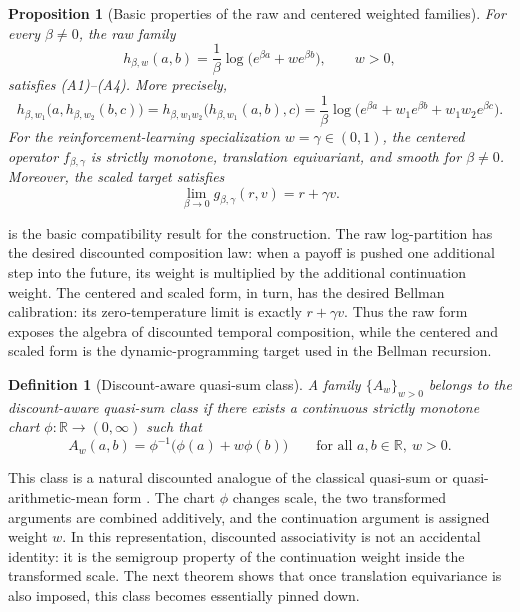 \documentclass{article}
\newtheorem{proposition}[proposition]{Proposition}
\newtheorem{definition}[definition]{Definition}
\theoremstyle{remark}
\newcommand{\R}{\mathbb{R}}
\begin{document}
\begin{proposition}[Basic properties of the raw and centered weighted families]
\label{prop:weighted-basic}
For every $\beta\neq 0$, the raw family
\[
 h_{\beta,w}(a,b)=\frac{1}{\beta}\log\!\bigl(e^{\beta a}+w e^{\beta b}\bigr),
 \qquad w>0,
\]
satisfies \textnormal{(A1)--(A4)}. More precisely,
\begin{equation}
 h_{\beta,w_1}\bigl(a,h_{\beta,w_2}(b,c)\bigr)
 =
 h_{\beta,w_1w_2}\bigl(h_{\beta,w_1}(a,b),c\bigr)
 =
 \frac{1}{\beta}\log\!\bigl(e^{\beta a}+w_1 e^{\beta b}+w_1w_2 e^{\beta c}\bigr).
\label{eq:discounted-assoc-weighted-lse}
\end{equation}
For the reinforcement-learning specialization $w=\gamma\in(0,1)$, the centered operator
$f_{\beta,\gamma}$ is strictly monotone, translation equivariant, and smooth for $\beta\neq 0$.
Moreover, the scaled target satisfies
\[
\lim_{\beta\to 0} g_{\beta,\gamma}(r,v)=r+\gamma v.
\]
\end{proposition}

 is the basic compatibility result for the construction. The raw
log-partition has the desired discounted composition law: when a payoff is pushed one additional
step into the future, its weight is multiplied by the additional continuation weight. The centered and
scaled form, in turn, has the desired Bellman calibration: its zero-temperature limit is exactly
$r+\gamma v$. Thus the raw form exposes the algebra of discounted temporal composition, while
the centered and scaled form is the dynamic-programming target used in the Bellman recursion.

\begin{definition}[Discount-aware quasi-sum class]
\label{def:discounted-quasi-sum}
A family $\{A_w\}_{w>0}$ belongs to the \emph{discount-aware quasi-sum class} if there exists a
continuous strictly monotone chart $\phi:\R\to(0,\infty)$ such that
\begin{equation}
A_w(a,b)=\phi^{-1}\!\bigl(\phi(a)+w\phi(b)\bigr)
\qquad \text{for all } a,b\in\R,\ w>0.
\label{eq:discounted-quasi-sum-def}
\end{equation}
\end{definition}

This class is a natural discounted analogue of the classical quasi-sum or quasi-arithmetic-mean
form \citep{pales1987quasi}. The chart $\phi$ changes scale, the two transformed arguments are
combined additively, and the continuation argument is assigned weight $w$. In this representation,
discounted associativity is not an accidental identity: it is the semigroup property of the continuation
weight inside the transformed scale. The next theorem shows that once translation equivariance is
also imposed, this class becomes essentially pinned down.
\end{document}
